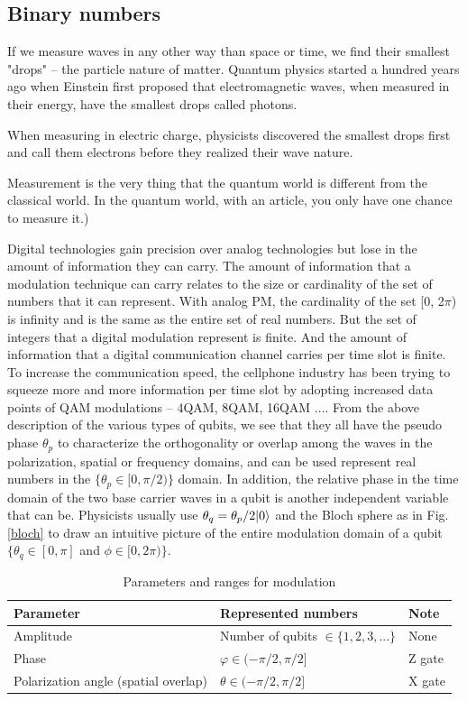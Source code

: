\documentclass[Letter,11pt]{book}
\begin{document}
\subsection{Binary numbers}

If we measure waves in any other way than space or time, we find their smallest "drops" -- the particle nature of matter. Quantum physics started a hundred years ago when Einstein first proposed that electromagnetic waves, when measured in their energy, have the smallest drops called photons.

When measuring in electric charge, physicists discovered the smallest drops first and call them electrons before they realized their wave nature.

Measurement is the very thing that the quantum world is different from the classical world. In the quantum world, with an article, you only have one chance to measure it.)

Digital technologies gain precision over analog technologies but lose in the amount of information they can carry. The amount of information that a modulation technique can carry relates to the size or cardinality of the set of numbers that it can represent. With analog PM, the cardinality of the set [0, 2$\pi$) is infinity and is the same as the entire set of real numbers. But the set of integers that a digital modulation represent is finite. And the amount of information that a digital communication channel carries per time slot is finite. To increase the communication speed, the cellphone industry has been trying to squeeze more and more information per time slot by adopting increased data points of QAM modulations -- 4QAM, 8QAM, 16QAM ....
From the above description of the various types of qubits, we see that they all have the pseudo phase $\theta_p$ to characterize the 
orthogonality or overlap among the waves in the polarization, spatial or frequency domains, and can be used represent real numbers in the $\{\theta_p \in [0, \pi/2)\}$ domain. In addition, the relative phase in the time domain of the two base carrier waves in a qubit is another independent variable that can be. Physicists usually use $\theta_q = \theta_p/2 \vert {0} \rangle_{}$ and the Bloch sphere as in Fig. \ref{bloch} to draw an intuitive picture of the entire modulation domain of a qubit $\{\theta_q \in [0, \pi]$ and $\phi \in [0, 2\pi)\}$.

\begin{table}[]
\caption{Parameters and ranges for modulation}
\label{modulation-parameters}
\begin{tabular}{|l|l|l|}
\hline Parameter &Represented numbers &Note                 \\
\hline Amplitude &Number of qubits $\in \{1, 2, 3, ...\}$   & None \\
\hline Phase & $\varphi \in (-\pi /2, \pi /2] $& Z gate \\
\hline Polarization angle (spatial overlap) & $\theta \in (-\pi /2, \pi /2]$ &X gate \\
\hline
\end{tabular}
\end{table}
\end{document}
